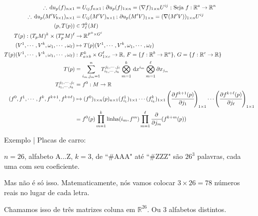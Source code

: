 \documentclass[12pt]{article}
\begin{document}
\begin{align}
  \therefore\,\mathrm{d}u_p(f)_{n \times 1} &= U_{ij} f_{n \times 1}\,;\,\partial u_p(f)_{1 \times n} = (\nabla f)_{1 \times n} U^{ij}\text{ ; Seja }f : \mathbb{R}^a \rightarrow \mathbb{R}^n \\
  \therefore\,\mathrm{d}u_p(M'V_{b \times 1})_{n \times 1} &= U_{ij} (M'V)_{n \times 1}\,;\,\partial u_p(M'V)_{1 \times n} = (\nabla (M'V))_{1 \times n} U^{ij} \\
  (p, T(p)) &\in \mathcal{T}^k_\ell(M) \\
  T(p) : (T_pM)^k \times (T_p^*M)^\ell &\rightarrow \mathbb{R}^{F^k \times G^\ell} \\
  (V^1, \cdots, V^k, \omega_1, \cdots, \omega_\ell) &\mapsto T(p)(V^1, \cdots, V^k, \omega_1, \cdots, \omega_\ell) \\
  T(p)(V^1, \cdots, V^k, \omega_1, \cdots, \omega_\ell) &: F_{a \times b}^k \times G_{1 \times c}^\ell \rightarrow \mathbb{R},\,F = \{ f : \mathbb{R}^b \rightarrow \mathbb{R}^a \},\,G = \{ f : \mathbb{R}^c \rightarrow \mathbb{R} \} \\
  T(p) &= \sum_{i_m, j_m = 1}^n T_{i_1, \cdots, i_{k}}^{j_1, \cdots, j_{\ell}}  \bigotimes_{m = 1}^k \,\mathrm{d}x^{i_m} \bigotimes_{m = 1}^\ell \partial x_{j_m}  \\
  T_{i_1, \cdots, i_{k}}^{j_1, \cdots, j_{\ell}} &= f^0 : M \rightarrow \mathbb{R} \\
  (f^0, f^1, \cdots, f^k, f^{k+1}, f^{k+\ell}) &\mapsto (f^0)_{1 \times n}(p)_{n \times 1} (f_{i_1}^1)_{1 \times 1} \cdots (f_{i_k}^k)_{1 \times 1} \left( \cfrac{\partial f^{k + 1}(p)}{\partial j_1} \right)_{1 \times 1} \cdots \left( \cfrac{\partial f^{k + \ell}(p)}{\partial j_\ell} \right)_{1 \times 1} \\
  &= f^0(p) \prod_{m = 1}^k \text{linha}(i_m, f^m) \prod_{m = 1}^\ell \cfrac{\partial}{\partial j_m} (f^{k + m}(p))
\end{align}

\vspace{3mm}

Exemplo | Placas de carro:

$n = 26$, alfabeto A...Z, $k = 3$, de ``\#AAA" at\'e ``\#ZZZ" s\~ao $26^3$ palavras, cada uma com seu coeficiente.

Mas n\~ao \'e s\'o isso. Matematicamente, n\'os vamos colocar $3 \times 26 = 78$ n\'umeros reais no lugar de cada letra.

Chamamos isso de tr\^es matrizes coluna em $\mathbb{R}^{26}$. Ou $3$ alfabetos distintos.
\end{document}
